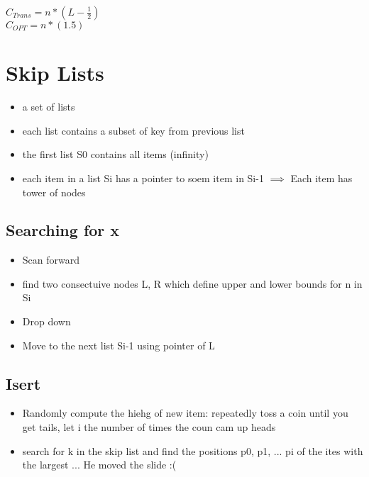 \documentclass[12pt]{article}
\begin{document}
	 $C_{Trans} = n*(L - \frac{1}{2})$\\
	 $C_{OPT} = n * (1.5)$\\
	 
	 \section*{Skip Lists}
	 \begin{itemize}
	 	\item a set of lists
	 	\item each list contains a subset of key from previous list
	 	\item the first list S0 contains all items (infinity)
	 	\item each item in a list Si has a pointer to soem item in Si-1 $\implies$ Each item has tower of nodes
	 \end{itemize}
	 
	 \subsection*{Searching for x}
	 \begin{itemize}
	 	\item Scan forward
	 	\item find two consectuive nodes L, R which define upper and lower bounds for n in Si
	 	\item Drop down
	 	\item Move to the next list Si-1 using pointer of L
	 \end{itemize}
	 \subsection*{Isert}
	 \begin{itemize}
	 	\item Randomly compute the hiehg of new item: repeatedly toss a coin until you get tails, let i the number of times the coun cam up heads
	 	\item search for k in the skip list and find the positions p0, p1, ... pi of the ites with the largest ... He moved the slide :(
	 \end{itemize}
\end{document}
